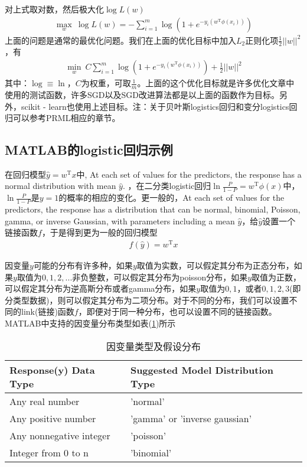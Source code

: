         对上式取对数，然后极大化$\log L(w)$
        \begin{align*}
        \max_w \ \log L(w) = -\sum_{i=1}^m\log\left(1+e^{-y_i(w^\mathrm{T}\phi(x_i))}\right)
        \end{align*}
        上面的问题是通常的最优化问题。我们在上面的优化目标中加入$L_2$正则化项$\frac{1}{2}||w||^2$，有
        \begin{align*}
        \min_w\ C\sum_{i=1}^m\log \left( 1+e^{-y_i(w^\mathrm{T}\phi(x_i))} \right) +\frac{1}{2}||w||^2
        \end{align*}
        其中：$\log \equiv \ln$，$C$为权重，可取$\frac{1}{m}$。上面的这个优化目标就是许多优化文章中使用的测试函数，许多SGD以及SGD改进算法都是以上面的函数作为目标。另外，scikit - learn也使用上述目标。注：关于贝叶斯logistics回归和变分logistics回归可以参考PRML相应的章节。
    \subsection{MATLAB的logistic回归示例}
        \par
        在回归模型$\hat{y} = w^\mathrm{T}x$中, At each set of values for the predictors, the response has a normal distribution with mean $\hat{y}$.
        ，在二分类logistic回归$\ln \frac{P}{1-P} = w^\mathrm{T}\phi(x)$中，$\ln \frac{P}{1-P}$是$y=1$的概率的相应的变化。更一般的，At each set of values for the predictors, the response has a distribution that can be normal, binomial, Poisson, gamma, or inverse Gaussian, with parameters including a mean $\hat{y}$，给$\hat{y}$设置一个链接函数$f$，于是得到更为一般的回归模型
        \begin{align*}
        f(\hat{y}) = w^\mathrm{T}x
        \end{align*}
        \par
        因变量$y$可能的分布有许多种，如果$y$取值为实数，可以假定其分布为正态分布，如果$y$取值为$0,1,2,...$非负整数，可以假定其分布为poisson分布，如果$y$取值为正数，可以假定其分布为逆高斯分布或者gamma分布，如果$y$取值为$0,1$，或者$0,1,2,3$(即分类型数据)，则可以假定其分布为二项分布。对于不同的分布，我们可以设置不同的link(链接)函数$f$，即便对于同一种分布，也可以设置不同的链接函数。MATLAB中支持的因变量分布类型如表(\ref{tab:因变量类型及分布})所示
        \begin{table}[H]\caption{因变量类型及假设分布}
        \label{tab:因变量类型及分布}
        \centering
        \begin{tabular}{l|l}
        \toprule
        Response(y) Data Type & Suggested Model Distribution Type \\
        \midrule
        Any real number &'normal'\\
        Any positive number &'gamma' or 'inverse gaussian'\\
        Any nonnegative integer& 'poisson'\\
        Integer from 0 to n& 'binomial'\\
        \bottomrule
        \end{tabular}
        \end{table}

